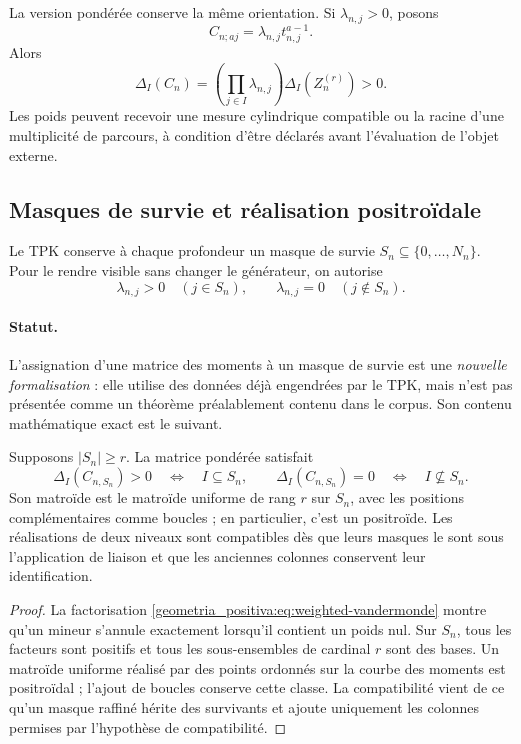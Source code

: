 La version pondérée conserve la même orientation. Si \(\lambda_{n,j}>0\), posons
\[
 C_{n;aj}=\lambda_{n,j}t_{n,j}^{a-1}.
\]
Alors
\begin{equation}
 \Delta_I(C_n)=\left(\prod_{j\in I}\lambda_{n,j}\right)
 \Delta_I(Z_n^{(r)})>0.
 \label{geometria_positiva:eq:weighted-vandermonde}
\end{equation}
Les poids peuvent recevoir une mesure cylindrique compatible ou la racine d’une multiplicité de parcours, à condition d’être déclarés avant l’évaluation de l’objet externe.

\subsection{Masques de survie et réalisation positroïdale}

Le TPK conserve à chaque profondeur un masque de survie \(S_n\subseteq\{0,\ldots,N_n\}\). Pour le rendre visible sans changer le générateur, on autorise
\[
 \lambda_{n,j}>0\quad(j\in S_n),\qquad
 \lambda_{n,j}=0\quad(j\notin S_n).
\]

\paragraph{Statut.}
L’assignation d’une matrice des moments à un masque de survie est une \emph{nouvelle formalisation} : elle utilise des données déjà engendrées par le TPK, mais n’est pas présentée comme un théorème préalablement contenu dans le corpus. Son contenu mathématique exact est le suivant.

\begin{proposition}
\label{geometria_positiva:thm:tpk-positroid-cell} Supposons \(|S_n|\ge r\). La matrice pondérée satisfait
\[
 \Delta_I(C_{n,S_n})>0\quad\Longleftrightarrow\quad I\subseteq S_n,
 \qquad
 \Delta_I(C_{n,S_n})=0\quad\Longleftrightarrow\quad I\not\subseteq S_n.
\]
Son matroïde est le matroïde uniforme de rang \(r\) sur \(S_n\), avec les positions complémentaires comme boucles ; en particulier, c’est un positroïde. Les réalisations de deux niveaux sont compatibles dès que leurs masques le sont sous l’application de liaison et que les anciennes colonnes conservent leur identification.
\end{proposition}
\begin{proof}
La factorisation \eqref{geometria_positiva:eq:weighted-vandermonde} montre qu’un mineur s’annule exactement lorsqu’il contient un poids nul. Sur \(S_n\), tous les facteurs sont positifs et tous les sous-ensembles de cardinal \(r\) sont des bases. Un matroïde uniforme réalisé par des points ordonnés sur la courbe des moments est positroïdal ; l’ajout de boucles conserve cette classe. La compatibilité vient de ce qu’un masque raffiné hérite des survivants et ajoute uniquement les colonnes permises par l’hypothèse de compatibilité.
\end{proof}

